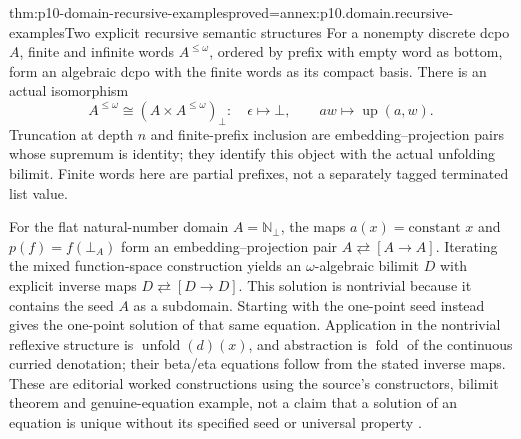 \begin{hbtheorem}{thm:p10-domain-recursive-examples}{proved=annex:p10.domain.recursive-examples}{Two explicit recursive semantic structures}
For a nonempty discrete dcpo \(A\), finite and infinite words
\(A^{\le\omega}\), ordered by prefix with empty word as bottom,
form an algebraic dcpo with the finite words as its compact basis.
There is an actual isomorphism
\[
 A^{\le\omega}\cong(A\times A^{\le\omega})_{\bot}:
 \quad\epsilon\mapsto\bot,\qquad aw\mapsto\operatorname{up}(a,w).
\]
Truncation at depth \(n\) and finite-prefix inclusion are
embedding--projection pairs whose supremum is identity; they
identify this object with the actual unfolding bilimit. Finite
words here are partial prefixes, not a separately tagged terminated
list value.

For the flat natural-number domain \(A=\mathbb N_{\bot}\), the
maps \(a(x)=\text{constant }x\) and \(p(f)=f(\bot_A)\)
form an embedding--projection pair
\(A\rightleftarrows[A\longrightarrow A]\).
Iterating the mixed function-space construction yields an
\(\omega\)-algebraic bilimit \(D\) with explicit inverse maps
\(D\rightleftarrows[D\longrightarrow D]\).
This solution is nontrivial because it contains the seed \(A\)
as a subdomain. Starting with the one-point seed instead gives the
one-point solution of that same equation. Application in the
nontrivial reflexive structure is
\(\operatorname{unfold}(d)(x)\), and abstraction is
\(\operatorname{fold}\) of the continuous curried denotation;
their beta/eta equations follow from the stated inverse maps.
These are editorial worked constructions using the source's
constructors, bilimit theorem and genuine-equation example,
not a claim that a solution of an equation is unique without
its specified seed or universal property
\cite[pp.~20,43,48--53,68--72]{AbramskyJungCorrectedExpandedDomainTheory}.
\end{hbtheorem}
